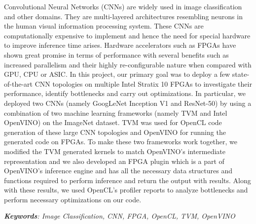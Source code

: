 \label{sct:abstract}
Convolutional Neural Networks (CNNs) are widely used in image classification and other domains. They are multi-layered architectures resembling neurons in the human visual information processing system. These CNNs are computationally expensive to implement and hence the need for special hardware to improve inference time arises. Hardware accelerators such as FPGAs have shown great promise in terms of performance with several benefits such as increased parallelism and their highly re-configurable nature when compared with GPU, CPU or ASIC.  In this project, our primary goal was to deploy a few state-of-the-art CNN topologies on multiple Intel Stratix 10 FPGAs to investigate their performance, identify bottlenecks and carry out optimizations. In particular, we deployed two CNNs (namely GoogLeNet Inception V1 and ResNet-50) by using a combination of two machine learning frameworks (namely TVM and Intel OpenVINO) on the ImageNet dataset. TVM was used for OpenCL code generation of these large CNN topologies and OpenVINO for running the generated code on FPGAs. To make these two frameworks work together, we modified the TVM generated kernels to match OpenVINO’s intermediate representation and we also developed an FPGA plugin which is a part of OpenVINO’s inference engine and has all the necessary data structures and functions required to perform inference and return the output with results. Along with these results, we used OpenCL’s profiler reports to analyze bottlenecks and perform necessary optimizations on our code.


\textit{\textbf{Keywords}: Image Classification, CNN, FPGA, OpenCL, TVM, OpenVINO}